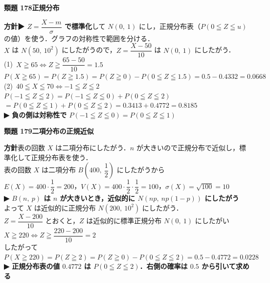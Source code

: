 \documentclass[a4paper,11pt]{ltjsarticle}
\newcommand{\ans}[2]{\Needspace{5\baselineskip}\vspace{6pt}%
  {\sffamily\bfseries 類題 #1\quad #2}\par}
\newcommand{\point}[1]{\textsf{\bfseries ▶ #1}}
\begin{document}
\ans{178}{正規分布}
\begin{kai}
\textbf{方針}\quad \point{$Z=\dfrac{X-m}{\sigma}$ で標準化}して $N(0,\ 1)$ にし，正規分布表（$P(0\leqq Z\leqq u)$ の値）を使う．グラフの対称性で範囲を分ける．\\[2pt]
$X$ は $N(50,\ 10^2)$ にしたがうので，$Z=\dfrac{X-50}{10}$ は $N(0,\ 1)$ にしたがう．\\[2pt]
(1)\ $X\geqq65\iff Z\geqq\dfrac{65-50}{10}=1.5$\\
\hspace*{1.5em}$P(X\geqq65)=P(Z\geqq1.5)=P(Z\geqq0)-P(0\leqq Z\leqq1.5)=0.5-0.4332=0.0668$\\[2pt]
(2)\ $40\leqq X\leqq70\iff-1\leqq Z\leqq2$\\
\hspace*{1.5em}$P(-1\leqq Z\leqq2)=P(-1\leqq Z\leqq0)+P(0\leqq Z\leqq2)$\\
\hspace*{1.5em}$=P(0\leqq Z\leqq1)+P(0\leqq Z\leqq2)=0.3413+0.4772=0.8185$\\
\hspace*{1.5em}\point{負の側は対称性で $P(-1\leqq Z\leqq0)=P(0\leqq Z\leqq1)$}
\end{kai}

\ans{179}{二項分布の正規近似}
\begin{kai}
\textbf{方針}\quad 表の回数 $X$ は二項分布にしたがう．$n$ が大きいので正規分布で近似し，標準化して正規分布表を使う．\\[2pt]
表の回数 $X$ は二項分布 $B\left(400,\ \dfrac12\right)$ にしたがうから\\
\hspace*{1.5em}$E(X)=400\cdot\dfrac12=200$，\quad $V(X)=400\cdot\dfrac12\cdot\dfrac12=100$，\quad $\sigma(X)=\sqrt{100}=10$\\
\point{$B(n,\ p)$ は $n$ が大きいとき，近似的に $N(np,\ np(1-p))$ にしたがう}\\
よって $X$ は近似的に正規分布 $N(200,\ 10^2)$ にしたがう．\\[2pt]
$Z=\dfrac{X-200}{10}$ とおくと，$Z$ は近似的に標準正規分布 $N(0,\ 1)$ にしたがい\\
\hspace*{1.5em}$X\geqq220\iff Z\geqq\dfrac{220-200}{10}=2$\\
したがって\\
\hspace*{1.5em}$P(X\geqq220)=P(Z\geqq2)=P(Z\geqq0)-P(0\leqq Z\leqq2)=0.5-0.4772=0.0228$\\
\point{正規分布表の値 $0.4772$ は $P(0\leqq Z\leqq2)$．右側の確率は $0.5$ から引いて求める}
\end{kai}
\end{document}
